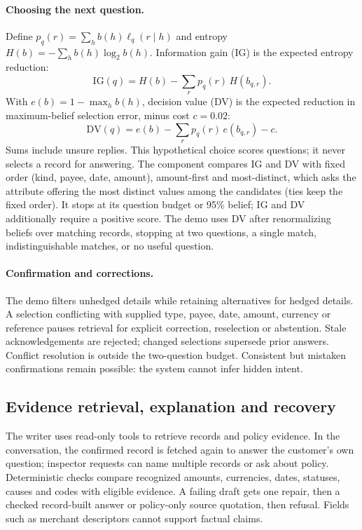 \documentclass[11pt]{article}
\begin{document}
\paragraph{Choosing the next question.}
Define $p_q(r)=\sum_h b(h)\ell_q(r\mid h)$ and entropy
$H(b)=-\sum_h b(h)\log_2 b(h)$. Information gain (IG) is the expected entropy reduction:
\begin{equation}
\mathrm{IG}(q)=H(b)-\sum_r p_q(r)\,H(b_{q,r}).
\label{eq:ig}
\end{equation}
With $e(b)=1-\max_h b(h)$, decision value (DV) is the expected reduction in maximum-belief
selection error, minus cost $c=0.02$:
\begin{equation}
\mathrm{DV}(q)=e(b)-\sum_r p_q(r)\,e(b_{q,r})-c.
\label{eq:dv}
\end{equation}
Sums include unsure replies. This hypothetical choice scores questions; it never selects a
record for answering. The component compares IG and DV with fixed order (kind, payee, date, amount),
amount-first and most-distinct, which asks the attribute offering the most distinct values among
the candidates (ties keep the fixed order). It stops at its question budget or 95\% belief;
IG and DV additionally require a positive score. The demo uses DV after renormalizing beliefs
over matching records, stopping at two questions, a single match, indistinguishable matches,
or no useful question.

\paragraph{Confirmation and corrections.}
The demo filters unhedged details while retaining alternatives for hedged details. A selection
conflicting with supplied type, payee, date, amount, currency or reference pauses retrieval for
explicit correction, reselection or abstention. Stale acknowledgements are rejected; changed
selections supersede prior answers. Conflict resolution is outside the two-question budget.
Consistent but mistaken confirmations remain possible: the system cannot infer hidden intent.

\subsection{Evidence retrieval, explanation and recovery}

The writer uses read-only tools to retrieve records and policy evidence. In the conversation,
the confirmed record is fetched again to answer the customer's own question; inspector requests
can name multiple records or ask about policy. Deterministic checks compare recognized amounts,
currencies, dates, statuses, causes and codes with eligible evidence. A failing draft gets one
repair, then a checked record-built answer or policy-only source quotation, then refusal. Fields such as merchant
descriptors cannot support factual claims.
\end{document}
